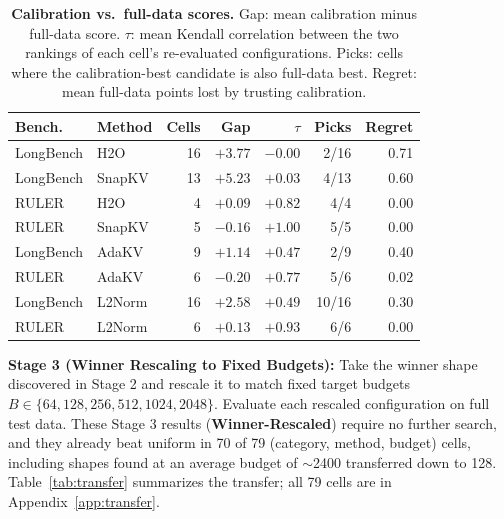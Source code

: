 \documentclass[11pt]{article}
\begin{document}
\begin{table}[htbp]
  \centering
  \footnotesize
  \setlength{\tabcolsep}{2.5pt}
  \begin{tabular}{@{} l l r r r r r @{}}
    \toprule
    \textbf{Bench.} & \textbf{Method} & \textbf{Cells} & \textbf{Gap} & \textbf{$\tau$} & \textbf{Picks} & \textbf{Regret} \\
    \midrule
    \rowcolor{gray!10}
    LongBench & H2O    & 16 & $+3.77$ & $-0.00$ & 2/16 & 0.71 \\
    LongBench & SnapKV & 13 & $+5.23$ & $+0.03$ & 4/13 & 0.60 \\
    \rowcolor{gray!10}
    RULER     & H2O    & 4  & $+0.09$ & $+0.82$ & 4/4  & 0.00 \\
    RULER     & SnapKV & 5  & $-0.16$ & $+1.00$ & 5/5  & 0.00 \\
    \midrule
    \rowcolor{gray!10}
    LongBench & AdaKV & 9 & $+1.14$ & $+0.47$ & 2/9 & 0.40 \\
    RULER     & AdaKV  & 6  & $-0.20$ & $+0.77$ & 5/6  & 0.02 \\
    \midrule
    \rowcolor{gray!10}
    LongBench & L2Norm & 16 & $+2.58$ & $+0.49$ & 10/16 & 0.30 \\
    RULER     & L2Norm & 6  & $+0.13$ & $+0.93$ & 6/6   & 0.00 \\
    \bottomrule
  \end{tabular}
  \caption{\textbf{Calibration vs.\ full-data scores.} Gap: mean calibration minus full-data score. $\tau$: mean Kendall correlation between the two rankings of each cell's re-evaluated configurations. Picks: cells where the calibration-best candidate is also full-data best. Regret: mean full-data points lost by trusting calibration.}
  \label{tab:calib}
\end{table}

\textbf{Stage 3 (Winner Rescaling to Fixed Budgets):} Take the winner shape discovered in Stage 2 and rescale it to match fixed target budgets $B \in \{64, 128, 256, 512, 1024, 2048\}$. Evaluate each rescaled configuration on full test data. These Stage 3 results (\textbf{Winner-Rescaled}) require no further search, and they already beat uniform in 70 of 79 (category, method, budget) cells, including shapes found at an average budget of $\sim$2400 transferred down to 128. Table~\ref{tab:transfer} summarizes the transfer; all 79 cells are in Appendix~\ref{app:transfer}.
\end{document}
